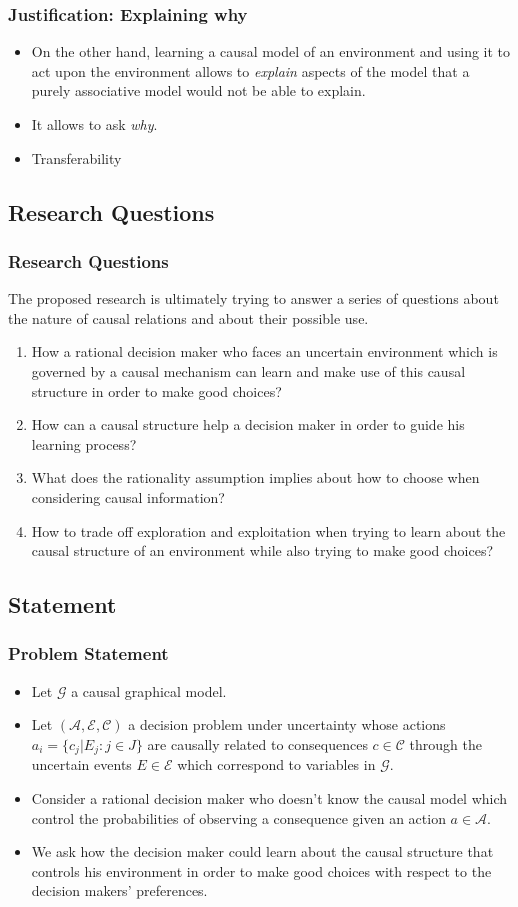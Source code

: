 \documentclass{beamer}
\theoremstyle{plain}
\begin{document}
	\begin{frame}
	\frametitle{Justification: Explaining why}
	\begin{itemize}
	\item On the other hand, learning a causal model of an environment and using it to act upon the environment allows to \textit{explain} aspects of the model that a purely associative model would not be able to explain. 
	\item It allows to ask \textit{why}.
	\item Transferability
	\end{itemize}
	\end{frame}

	\subsection{Research Questions}
	\begin{frame}
	\frametitle{Research Questions}
	The proposed research is ultimately trying to answer a series of questions about the nature of causal relations and about their possible use.
	\begin{enumerate}
	\item How a rational decision maker who faces an uncertain environment which is governed by a causal mechanism can learn and make use of this causal structure in order to make good    	choices? 
	\item How can a causal structure help a decision maker in order to guide his learning process? 
	\item What does the rationality assumption implies about how to choose when considering causal information? 
\item How to trade off exploration and exploitation when trying to learn about the causal structure of an environment while also trying to make good choices?
\end{enumerate}
\end{frame}

\subsection{Statement}
	\begin{frame}
	\frametitle{Problem Statement}
	\begin{itemize}
	\item Let  $\mathcal{G}$ a causal graphical model.
	\item Let $(\mathcal{A},\mathcal{E},\mathcal{C})$ a decision problem under uncertainty whose actions $a_i = \{ c_j | E_j : j \in J \}$  are causally related to consequences $c \in \mathcal{C}$ through the uncertain events $E \in \mathcal{E}$ which correspond to variables in $\mathcal{G}$. 
	\item Consider a rational decision maker who doesn't know the causal model which control the probabilities of observing a consequence given an action $a \in \mathcal{A}$.
	\item We ask how the decision maker could learn about the causal structure that controls his environment in order to make good choices with respect to the decision makers' preferences.
	\end{itemize}
	\end{frame}
\end{document}
